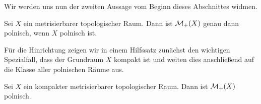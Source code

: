 \documentclass[../main/main.tex]{subfiles}
\begin{document}
	Wir werden uns nun der zweiten Aussage vom Beginn dieses Abschnittes widmen. 
	
	\begin{Satz}
		\label{thm:finitemeasurespolish}
		Sei $X$ ein metrisierbarer topologischer Raum. Dann ist $\mathcal{M}_{+}(X)$ genau dann polnisch, wenn $X$ polnisch ist.
	\end{Satz}
	
	Für die Hinrichtung zeigen wir in einem Hilfssatz zunächst den wichtigen Spezialfall, dass der Grundraum $X$ kompakt ist und weiten dies anschließend auf die Klasse aller polnischen Räume aus.

	\begin{Hilfssatz}
		\label{lem:compactimpliespolishmeasures}
		Sei $X$ ein kompakter metrisierbarer topologischer Raum. Dann ist $\mathcal{M}_{+}(X)$ polnisch.
	\end{Hilfssatz}
	
\end{document}
